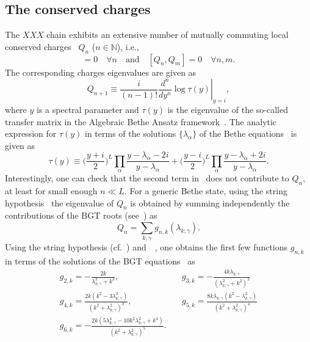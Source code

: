 \documentclass[11pt]{iopart}
\begin{document}
\subsection{The conserved charges}
\label{sec:1.5}

The $XXX$ chain exhibits an extensive number of mutually commuting local conserved 
charges~\cite{grabowski-1995} $Q_n$ ($n\in\mathbb{N}$), i.e., 
%
\begin{equation}
[Q_n,{\mathcal H}]=0\quad\forall n\quad\textrm{and}\quad [Q_n,Q_m]=0\quad\forall n,m.
\end{equation}
%
The corresponding charges eigenvalues are given as 
%
\begin{equation}
\label{Q-def}
\left.Q_{n+1}\equiv\frac{i}{(n-1)!}\frac{d^n}{dy^n}\log\tau
(y)\right|_{y=i},
\end{equation}
%
where $y$ is a spectral parameter and $\tau(y)$ is the eigenvalue of the so-called 
transfer matrix in the Algebraic Bethe Ansatz framework~\cite{kor-book}. The analytic 
expression for $\tau(y)$ in terms of the solutions $\{\lambda_\alpha\}$ of the Bethe 
equations~ is given as 
%
\begin{equation}
\label{tau}
\tau(y)\equiv\Big(\frac{y+i}{2}\Big)^L\prod\limits_\alpha\frac{y-\lambda_\alpha-2i}
{y-\lambda_\alpha}+\Big(\frac{y-i}{2}\Big)^L\prod\limits_\alpha\frac{y-\lambda_\alpha
+2i}{y-\lambda_\alpha}.
\end{equation}
%
Interestingly, one can check that the second term in~ does not contribute to 
$Q_n$, at least for small enough $n\ll L$. For a generic Bethe state, using the string 
hypothesis~ the eigenvalue of $Q_n$ is obtained by summing 
independently the contributions of the BGT roots (see~) as 
%
\begin{equation}
\label{qngnk}
Q_n=\sum_{k,\gamma}g_{n,k}(\lambda_{k;\gamma}).
\end{equation}
%
Using the string hypothesis (cf.~) and~~, one obtains  
the first few functions $g_{n,k}$ in terms of the solutions of the BGT equations~ 
as 
%
\begin{eqnarray}
\label{gnk}
g_{2,k}=-\frac{2k}{\lambda^2_{k;\gamma}+k^2}, &\quad g_{3,k}=-\frac{4k\lambda_{k;\gamma}}
{(\lambda_{k;\gamma}^2+k^2)^2}\\\nonumber  
g_{4,k}=\frac{2k(k^2-3\lambda_{k;\gamma}^2)}{(k^2+\lambda_{k;\gamma}^2)^3}, &\quad 
g_{5,k}=\frac{8k\lambda_{k;\gamma}(k^2-\lambda_{k;\gamma}^2)}{(k^2+
\lambda_{k;\gamma}^2)^4}\\\nonumber
g_{6,k}=-\frac{2k(5\lambda_{k;\gamma}^4-10k^2\lambda_{k;\gamma}^2+k^4)}{(k^2+
\lambda_{k;\gamma}^2)^5}. 
\end{eqnarray}
\end{document}
